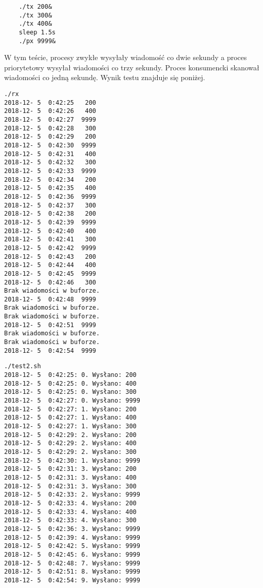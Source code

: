 \documentclass{mwrep}
\begin{document}
\begin{verbatim}
    ./tx 200&
    ./tx 300&
    ./tx 400&
    sleep 1.5s
    ./px 9999&
\end{verbatim}

W tym teście, procesy zwykłe wysyłały wiadomość co dwie sekundy a proces priorytetowy wysyłał wiadomości
co trzy sekundy. Proces konsumencki skanował wiadomości co jedną sekundę.
Wynik testu znajduje się poniżej.

\begin{paracol}{2}
\begin{verbatim}
./rx
2018-12- 5  0:42:25   200
2018-12- 5  0:42:26   400
2018-12- 5  0:42:27  9999
2018-12- 5  0:42:28   300
2018-12- 5  0:42:29   200
2018-12- 5  0:42:30  9999
2018-12- 5  0:42:31   400
2018-12- 5  0:42:32   300
2018-12- 5  0:42:33  9999
2018-12- 5  0:42:34   200
2018-12- 5  0:42:35   400
2018-12- 5  0:42:36  9999
2018-12- 5  0:42:37   300
2018-12- 5  0:42:38   200
2018-12- 5  0:42:39  9999
2018-12- 5  0:42:40   400
2018-12- 5  0:42:41   300
2018-12- 5  0:42:42  9999
2018-12- 5  0:42:43   200
2018-12- 5  0:42:44   400
2018-12- 5  0:42:45  9999
2018-12- 5  0:42:46   300
Brak wiadomości w buforze.
2018-12- 5  0:42:48  9999
Brak wiadomości w buforze.
Brak wiadomości w buforze.
2018-12- 5  0:42:51  9999
Brak wiadomości w buforze.
Brak wiadomości w buforze.
2018-12- 5  0:42:54  9999
\end{verbatim}
	\switchcolumn
	\begin{verbatim}
./test2.sh
2018-12- 5  0:42:25: 0. Wysłano: 200
2018-12- 5  0:42:25: 0. Wysłano: 400
2018-12- 5  0:42:25: 0. Wysłano: 300
2018-12- 5  0:42:27: 0. Wysłano: 9999
2018-12- 5  0:42:27: 1. Wysłano: 200
2018-12- 5  0:42:27: 1. Wysłano: 400
2018-12- 5  0:42:27: 1. Wysłano: 300
2018-12- 5  0:42:29: 2. Wysłano: 200
2018-12- 5  0:42:29: 2. Wysłano: 400
2018-12- 5  0:42:29: 2. Wysłano: 300
2018-12- 5  0:42:30: 1. Wysłano: 9999
2018-12- 5  0:42:31: 3. Wysłano: 200
2018-12- 5  0:42:31: 3. Wysłano: 400
2018-12- 5  0:42:31: 3. Wysłano: 300
2018-12- 5  0:42:33: 2. Wysłano: 9999
2018-12- 5  0:42:33: 4. Wysłano: 200
2018-12- 5  0:42:33: 4. Wysłano: 400
2018-12- 5  0:42:33: 4. Wysłano: 300
2018-12- 5  0:42:36: 3. Wysłano: 9999
2018-12- 5  0:42:39: 4. Wysłano: 9999
2018-12- 5  0:42:42: 5. Wysłano: 9999
2018-12- 5  0:42:45: 6. Wysłano: 9999
2018-12- 5  0:42:48: 7. Wysłano: 9999
2018-12- 5  0:42:51: 8. Wysłano: 9999
2018-12- 5  0:42:54: 9. Wysłano: 9999
\end{verbatim}
\end{paracol}
\end{document}
